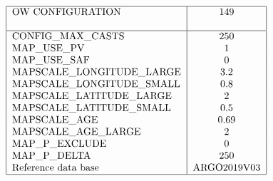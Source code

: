 \documentclass[11pt,titlepage]{article}
\begin{document}
\pagestyle{plain}
\begin{table}[h]
$$
\begin{tabular}{|l|c|}
\hline
OW CONFIGURATION 		& 149     	\\
				&                \\
\hline
CONFIG\_MAX\_CASTS		& 250     	\\
MAP\_USE\_PV			& 1       	\\
MAP\_USE\_SAF		        & 0        	\\
MAPSCALE\_LONGITUDE\_LARGE	& 3.2     	\\
MAPSCALE\_LONGITUDE\_SMALL	& 0.8        \\
MAPSCALE\_LATITUDE\_LARGE 	& 2           \\
MAPSCALE\_LATITUDE\_SMALL 	& 0.5      \\
MAPSCALE\_AGE		 	& 0.69    \\
MAPSCALE\_AGE\_LARGE		& 2    	\\
MAP\_P\_EXCLUDE		 	& 0      \\
MAP\_P\_DELTA		 	& 250      \\
Reference data base      	&  ARGO2019V03   \\ 
\hline
\end{tabular}
$$
\label{tab3}
\end{table}
\end{document}
